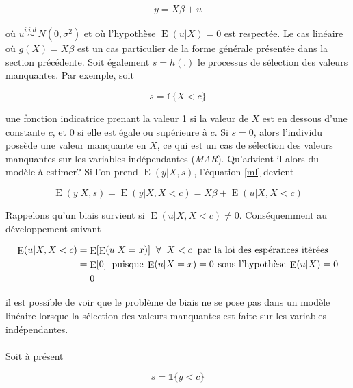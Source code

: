 \documentclass{article}
\DeclareMathOperator{\esp}{E}
\begin{document}
\begin{align}
\label{ml}
y=X\beta+u
\end{align}

o\`{u} $u\overset{i.i.d.}{\sim} N(0,\sigma^2)$ et o\`{u} l'hypoth\`{e}se $\esp(u|X)=0$ est respect\'{e}e. Le cas lin\'{e}aire o\`{u} $g(X)=X\beta$ est un cas particulier de la forme g\'{e}n\'{e}rale pr\'{e}sent\'{e}e dans la section pr\'{e}c\'{e}dente. Soit \'{e}galement $s=h(.)$ le processus de s\'{e}lection des valeurs manquantes. Par exemple, soit

\[s=\mathds{1}\{X<c\}\]

une fonction indicatrice prenant la valeur 1 si la valeur de $X$ est en dessous d'une constante $c$, et 0 si elle est \'{e}gale ou sup\'{e}rieure \`{a} $c$. Si $s=0$, alors l'individu poss\`{e}de une valeur manquante en $X$, ce qui est un cas de s\'{e}lection des valeurs manquantes sur les variables ind\'{e}pendantes (\textit{MAR}). Qu'advient-il alors du mod\`{e}le \`{a} estimer? Si l'on prend $\esp(y|X,s)$, l'\'{e}quation \eqref{ml} devient

\[\esp(y|X,s)=\esp(y|X,X<c)=X\beta+\esp(u|X,X<c)\]

Rappelons qu'un biais survient si $\esp(u|X,X<c)\neq0$. Cons\'{e}quemment au développement suivant 

\begin{align}
\esp(u|X,X<c) & = \esp[\esp(u|X=x)] \hspace{0.2cm} \forall \hspace{0.2cm}  X<c \hspace{0.2cm} \text{par la loi des esp\'{e}rances it\'{e}r\'{e}es} \nonumber \\
 & = \esp[0] \hspace{0.2cm} \text{puisque} \hspace{0.1cm} \esp(u|X=x)=0 \hspace{0.15cm} \text{sous l'hypoth\`{e}se} \hspace{0.1cm} \esp(u|X)=0 \nonumber \\
 & = 0 \nonumber 
\end{align}

il est possible de voir que le probl\`{e}me de biais ne se pose pas dans un mod\`{e}le lin\'{e}aire lorsque la s\'{e}lection des valeurs manquantes est faite sur les variables ind\'{e}pendantes.
\\
\\
Soit \`{a} pr\'{e}sent

\[s=\mathds{1}\{y<c\}\]
\end{document}
